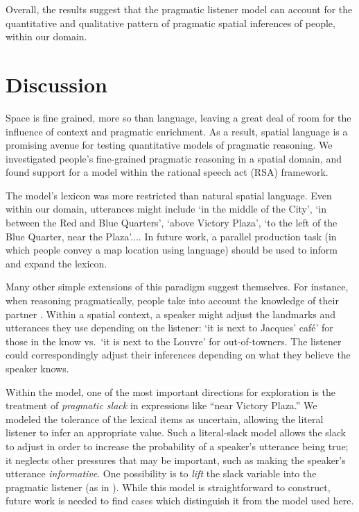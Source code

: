 \documentclass[10pt,letterpaper]{article}
\newcommand{\ndg}[1]{\textcolor{Green}{[ndg: #1]}}
\begin{document}
Overall, the results suggest that the pragmatic listener model can account for the quantitative and qualitative pattern of pragmatic spatial inferences of people, within our domain.  

\section{Discussion}



Space is fine grained, more so than language, leaving a great deal of room for the influence of context and pragmatic enrichment. As a result, spatial language is a promising avenue for testing quantitative models of pragmatic reasoning. We investigated people's fine-grained pragmatic reasoning in a spatial domain, and found support for a model within the rational speech act (RSA) framework.  

The model's lexicon was more restricted than natural spatial language. Even within our domain, utterances might include `in the middle of the City', `in between the Red and Blue Quarters', `above Victory Plaza', `to the left of the Blue Quarter, near the Plaza'.... In future work, a parallel production task (in which people convey a map location using language) should be used to inform and expand the lexicon. 

Many other simple extensions of this paradigm suggest themselves. For instance, when reasoning pragmatically, people take into account the knowledge of their partner \cite{ndg+ast:topics2013}. Within a spatial context, a speaker might adjust the landmarks and utterances they use depending on the listener: `it is next to Jacques' caf\'{e}' for those in the know vs.~`it is next to the Louvre' for out-of-towners. The listener could correspondingly adjust their inferences depending on what they believe the speaker knows.

Within the model, one of the most important directions for exploration is the treatment of \emph{pragmatic slack} in expressions like ``near Victory Plaza.'' We modeled the tolerance of the lexical items as uncertain, allowing the literal listener to infer an appropriate value. Such a literal-slack model allows the slack to adjust in order to increase the probability of a speaker's utterance being true; it neglects other pressures that may be important, such as making the speaker's utterance \emph{informative}. 
One possibility is to \emph{lift} the slack variable into the pragmatic listener (as in ). While this model is straightforward to construct, future work is needed to find cases which distinguish it from the model used here.
\end{document}
